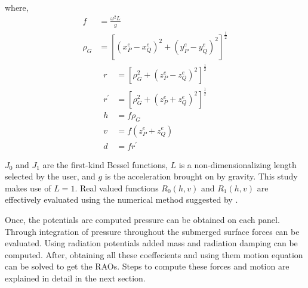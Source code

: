 where, 
\begin{align}
    f &= \frac{\omega^2 L}{g} \\
    \rho_G &= \left[(x^e_P-x^e_Q)^2 + (y^e_P-y^e_Q)^2\right]^{\frac{1}{2}}
\end{align}
\begin{align}
    r &= \left[\rho^2_G+(z^e_P-z^e_Q)^2\right]^{\frac{1}{2}} \\
    {r}^{\prime}&= \left[\rho^2_G+(z^e_P+z^e_Q)^2\right]^{\frac{1}{2}} \\
    h &= f\rho_G \\
    v &= f(z^e_P+z^e_Q) \\
    d &= f {r}^{\prime}
\end{align}

$J_0$ and $J_1$ are the first-kind Bessel functions, $L$ is a non-dimensionalizing length selected by the user, 
and $g$ is the acceleration brought on by gravity. This study makes use of $L=1$. Real valued functions $R_0(h,v)$ 
and $R_1(h,v)$ are effectively evaluated using the numerical method suggested by \cite{telste1986numerical}.

Once, the potentials are computed pressure can be obtained on each panel.
Through integration of pressure throughout the submerged surface forces can be evaluated. 
Using radiation potentials added mass and radiation damping can be computed. 
After, obtaining all these coeffecients and using them motion equation can be solved to get the RAOs.
Steps to compute these forces and motion are explained in detail in the next section.